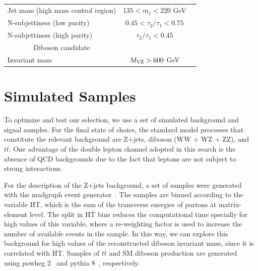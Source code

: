 \begin{landscape}
\begin{table}[p]
\begin{center}
\begin{tabular}{lcc}
Jet mass (high mass control region)     & $ 135 < m_j < 220 $ GeV \T& \\
N-subjettiness (low purity)             & $ 0.45 < \tau_2/\tau_1 < 0.75 $  \T& \\
N-subjettiness (high purity)            & $ \tau_2/\tau_1 < 0.45$  \T& \\
\hline
\multicolumn{1}{c}{Diboson candidate \T}\\
\cline{1-1}
Invariant mass & $M_{\rm VZ}>600$ GeV        \T& \\
\hline						       
\end{tabular}
\end{center}
\end{table}
\end{landscape}

\clearpage
\section{Simulated Samples}

To optimize and test our selection, we use a set of simulated background and signal samples. For the final state of choice, the standard model processes that constitute the relevant background are Z+jets, diboson (WW + WZ + ZZ), and $t\bar{t}$. One advantage of the double lepton channel adopted in this search is the absence of QCD backgrounds due to the fact that leptons are not subject to strong interactions. 

For the description of the Z+jets background, a set of samples were generated with the {\sc madgraph} event generator~\cite{Alwall:2014hca}. The samples are binned according to the variable HT, which is the sum of the transverse energies of partons at matrix-element level. The split in HT bins reduces the computational time specially for high values of this variable, where a re-weighting factor is used to increase the number of available events in the sample. In this way, we can explore this background for high values of the reconstructed diboson invariant mass, since it is correlated with HT. Samples of $t\bar{t}$ and SM diboson production are generated using {\sc powheg} 2~\cite{Nason:2004rx,Frixione:2007,Alioli:2008} and {\sc pythia} 8~\cite{PYTHIA6, PYTHIA8}, respectively.

